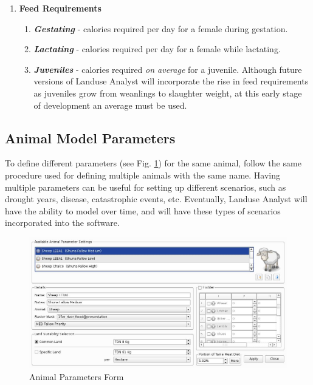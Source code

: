 \begin{enumerate}
    \item \textbf{Feed Requirements}
      \begin{enumerate}
        \item  \textit{\textbf{Gestating}} - calories required per
day for a female during gestation.
        \item  \textit{\textbf{Lactating}} - calories required per
day for a female while lactating.
        \item  \textit{\textbf{Juveniles}} - calories required
\textit{on average} for a juvenile.  Although future versions of Landuse Analyst
will incorporate the rise in feed requirements as juveniles grow from weanlings
to slaughter weight, at this early stage of development an average must be used.
      \end{enumerate}
  \end{enumerate}

  \subsection{Animal Model Parameters}
To define different parameters (see Fig. \ref{fig:animalParameters}) for the same animal, follow the same procedure
used for defining multiple animals with the same name. Having multiple parameters can be useful for setting up different scenarios, such as drought years, disease,
catastrophic events, etc. Eventually, Landuse Analyst will have the ability to
model over time, and will have these types of scenarios incorporated into the
software.

\begin{figure}[htbp]
    \includegraphics[scale=.23]{./images/animalParameters.jpg}
  \caption{\label{fig:animalParameters}Animal Parameters Form}
\end{figure}

